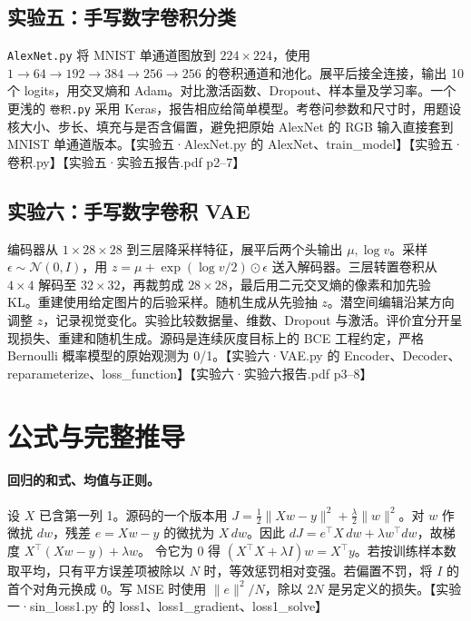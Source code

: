 \documentclass[UTF8,a4paper,zihao=-4,fontset=fandol]{ctexrep}
\begin{document}
\subsection{实验五：手写数字卷积分类}
\texttt{AlexNet.py} 将 MNIST 单通道图放到 $224\times224$，使用 $1\to64\to192\to384\to256\to256$ 的卷积通道和池化。展平后接全连接，输出 10 个 logits，用交叉熵和 Adam。对比激活函数、Dropout、样本量及学习率。一个更浅的 \texttt{卷积.py} 采用 Keras，报告相应给简单模型。考卷问参数和尺寸时，用题设核大小、步长、填充与是否含偏置，避免把原始 AlexNet 的 RGB 输入直接套到 MNIST 单通道版本。【实验五·AlexNet.py 的 AlexNet、train\_model】【实验五·卷积.py】【实验五·实验五报告.pdf p2–7】

\subsection{实验六：手写数字卷积 VAE}
编码器从 $1\times28\times28$ 到三层降采样特征，展平后两个头输出 $\mu,\log v$。采样 $\epsilon\sim\mathcal N(0,I)$，用 $z=\mu+\exp(\log v/2)\odot\epsilon$ 送入解码器。三层转置卷积从 $4\times4$ 解码至 $32\times32$，再裁剪成 $28\times28$，最后用二元交叉熵的像素和加先验 KL。重建使用给定图片的后验采样。随机生成从先验抽 $z$。潜空间编辑沿某方向调整 $z$，记录视觉变化。实验比较数据量、维数、Dropout 与激活。评价宜分开呈现损失、重建和随机生成。源码是连续灰度目标上的 BCE 工程约定，严格 Bernoulli 概率模型的原始观测为 0/1。【实验六·VAE.py 的 Encoder、Decoder、reparameterize、loss\_function】【实验六·实验六报告.pdf p3–8】

\section{公式与完整推导}

\paragraph{回归的和式、均值与正则。}
设 $X$ 已含第一列 1。源码的一个版本用 $J=\frac12\|Xw-y\|^2+\frac\lambda2\|w\|^2$。对 $w$ 作微扰 $dw$，残差 $e=Xw-y$ 的微扰为 $X\,dw$。因此
$dJ=e^\top X\,dw+\lambda w^\top dw$，故梯度 $X^\top(Xw-y)+\lambda w$。
令它为 0 得 $(X^\top X+\lambda I)w=X^\top y$。若按训练样本数取平均，只有平方误差项被除以 $N$ 时，等效惩罚相对变强。若偏置不罚，将 $I$ 的首个对角元换成 0。写 MSE 时使用 $\|e\|^2/N$，除以 $2N$ 是另定义的损失。【实验一·sin\_loss1.py 的 loss1、loss1\_gradient、loss1\_solve】
\end{document}
